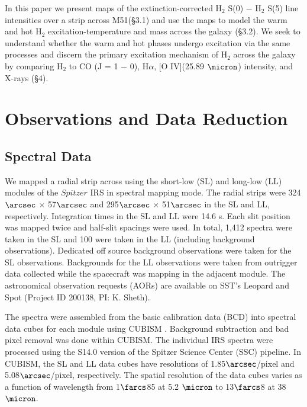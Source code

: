 \documentclass[manuscript]{aastex}
\begin{document}
In this paper we present maps of the extinction-corrected $\mathrm{H_2}$ S(0) $-$ $\mathrm{H_2}$ S(5) line intensities over a strip across M51(\S3.1) and use the maps to model the warm and hot $\mathrm{H_2}$ excitation-temperature and mass across the galaxy (\S3.2).  We seek to understand  whether the warm and hot phases undergo excitation via the same processes and discern the primary excitation mechanism of $\mathrm{H_2}$ across the galaxy by comparing $\mathrm{H_2}$ to CO (J = 1 $-$ 0), H$\alpha$, [O IV](25.89 $\micron$) intensity, and X-rays (\S4).

\section{Observations and Data Reduction}

\subsection{Spectral Data}

We mapped a radial strip across  using the short-low (SL) and long-low (LL) modules of the $Spitzer$ IRS in spectral mapping mode.  The radial strips were 324$\arcsec$ $\times$ 57$\arcsec$ and 295$\arcsec$ $\times$ 51$\arcsec$ in the SL and LL, respectively.  Integration times in the SL and LL were 14.6 s.  Each slit position was mapped twice and half-slit spacings were used.  In total, 1,412 spectra were taken in the SL and 100 were taken in the LL (including background observations).  Dedicated off source background observations were taken for the SL observations.  Backgrounds for the LL observations were taken from outrigger data collected while the spacecraft was mapping in the adjacent module.  The astronomical observation requests (AORs) are available on SST's Leopard and Spot (Project ID 200138, PI: K. Sheth).

The spectra were assembled from the basic calibration data (BCD) into spectral data cubes for each module using CUBISM \citep{ken03, smi04}.  Background subtraction and bad pixel removal was done within CUBISM.  The individual IRS spectra were processed using the S14.0 version of the Spitzer Science Center (SSC) pipeline.  In CUBISM, the SL and LL data cubes have resolutions of 1.85$\arcsec$/pixel and 5.08$\arcsec$/pixel, respectively.  The spatial resolution of the data cubes varies as a function of wavelength from 1$\farcs$85 at 5.2 $\micron$ to 13$\farcs$8 at 38 $\micron$.  %
\end{document}

